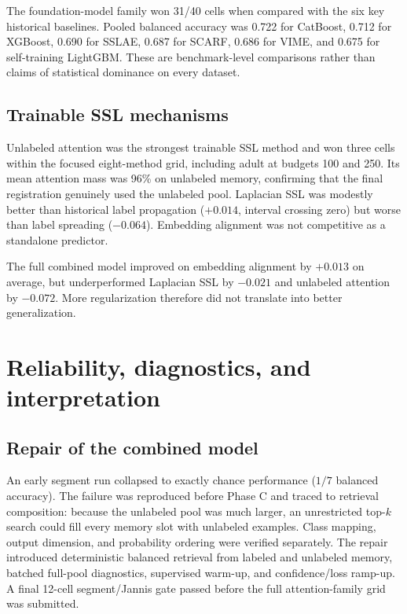\documentclass[10pt]{article}
\begin{document}
The foundation-model family won 31/40 cells when compared with the six key
historical baselines. Pooled balanced accuracy was 0.722 for CatBoost, 0.712
for XGBoost, 0.690 for SSLAE, 0.687 for SCARF, 0.686 for VIME, and 0.675 for
self-training LightGBM. These are benchmark-level comparisons rather than
claims of statistical dominance on every dataset.

\subsection{Trainable SSL mechanisms}

Unlabeled attention was the strongest trainable SSL method and won three cells
within the focused eight-method grid, including adult at budgets 100 and 250.
Its mean attention mass was 96\% on unlabeled memory, confirming that the final
registration genuinely used the unlabeled pool. Laplacian SSL was modestly
better than historical label propagation (\(+0.014\), interval crossing zero)
but worse than label spreading (\(-0.064\)). Embedding alignment was not
competitive as a standalone predictor.

The full combined model improved on embedding alignment by \(+0.013\) on
average, but underperformed Laplacian SSL by \(-0.021\) and unlabeled attention
by \(-0.072\). More regularization therefore did not translate into better
generalization.

\newpage

\section{Reliability, diagnostics, and interpretation}

\subsection{Repair of the combined model}

An early segment run collapsed to exactly chance performance (\(1/7\) balanced
accuracy). The failure was reproduced before Phase C and traced to retrieval
composition: because the unlabeled pool was much larger, an unrestricted
top-\(k\) search could fill every memory slot with unlabeled examples. Class
mapping, output dimension, and probability ordering were verified separately.
The repair introduced deterministic balanced retrieval from labeled and
unlabeled memory, batched full-pool diagnostics, supervised warm-up, and
confidence/loss ramp-up. A final 12-cell segment/Jannis gate passed before the
full attention-family grid was submitted.
\end{document}
